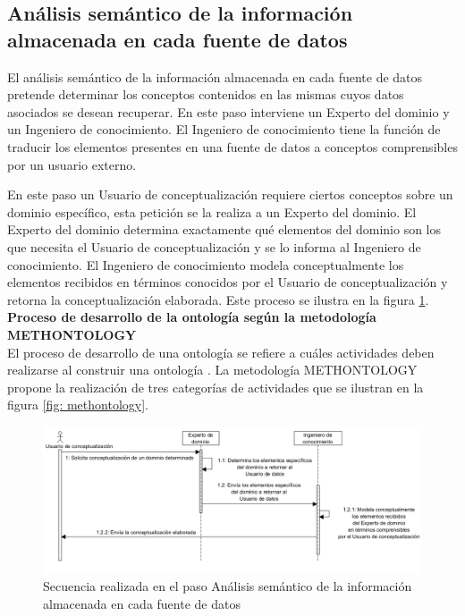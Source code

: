 \subsection{Análisis semántico de la información almacenada en cada fuente de datos}

El análisis semántico de la información almacenada en cada fuente de datos pretende determinar los conceptos contenidos en las mismas cuyos datos asociados se desean recuperar. En este paso interviene un Experto del dominio y un Ingeniero de conocimiento. El Ingeniero de conocimiento tiene la función de traducir los elementos presentes en una fuente de datos a conceptos comprensibles por un usuario externo.

En este paso un Usuario de conceptualización requiere ciertos conceptos sobre un dominio específico, esta petición se la realiza a un Experto del dominio. El Experto del dominio determina exactamente qué elementos del dominio son los que necesita el Usuario de conceptualización y se lo informa al Ingeniero de conocimiento. El Ingeniero de conocimiento modela conceptualmente los elementos recibidos en términos conocidos por el Usuario de conceptualización y retorna la conceptualización elaborada. Este proceso se ilustra en la figura \ref{fig: conceptsExtraction}.\\

\textbf{Proceso de desarrollo de la ontología según la metodología METHONTOLOGY}\\

El proceso de desarrollo de una ontología se refiere a cuáles actividades deben realizarse al construir una ontología \citep{Gomez-Perez:2007:OEE:1199560}. La metodología METHONTOLOGY propone la realización de tres categorías de actividades que se ilustran en la figura \ref{fig: methontology}.

\begin{figure}
\begin{center}
	\includegraphics[width=1\textwidth]{img/conceptsExtraction.png}
\end{center}
\caption{Secuencia realizada en el paso Análisis semántico de la información almacenada en cada fuente de datos}
\label{fig: conceptsExtraction}
\end{figure}

